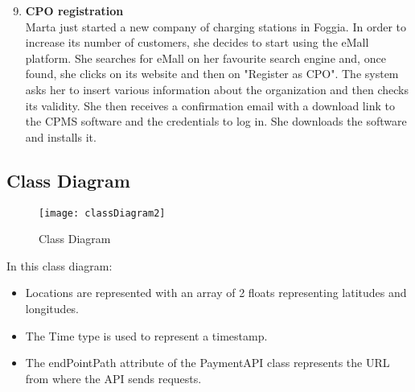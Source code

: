\begin{enumerate}
    \setcounter{enumi}{8}
    \item \textbf{CPO registration}\\
    Marta just started a new company of charging stations in Foggia. In order to increase its number of customers, she decides to start using the eMall platform. She searches for eMall on her favourite search engine and, once found, she clicks on its website and then on "Register as CPO".
    The system asks her to insert various information about the organization and then checks its validity. She then receives a confirmation email with a download link to the CPMS software and the credentials to log in. She downloads the software and installs it.
\end{enumerate}
\subsection{Class Diagram}
\label{subsec:classDiagram}
    \begin{figure}[H]
        \begin{center}
        \texttt{[image: classDiagram2]}
        \caption{Class Diagram}
        \label{fig:classDiagram}
        \end{center}
    \end{figure}
    In this class diagram:
    \begin{itemize}
        \item Locations are represented with an array of 2 floats representing latitudes and longitudes.
        \item The Time type is used to represent a timestamp.
        \item The endPointPath attribute of the PaymentAPI class represents the URL from where the API sends requests.
    \end{itemize}     
    \newpage
